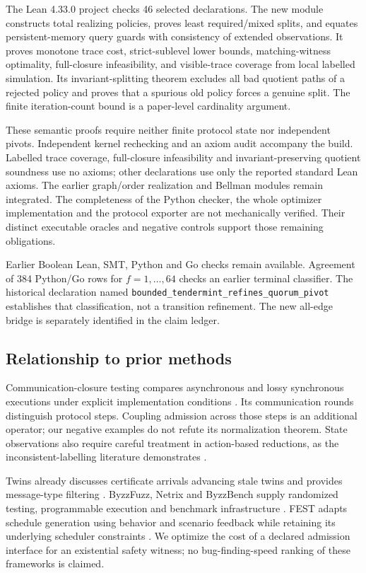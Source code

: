 The Lean 4.33.0 project checks 46 selected declarations. The new module
constructs total realizing policies, proves least required/mixed splits,
and equates persistent-memory query guards with consistency of extended
observations. It proves monotone trace cost, strict-sublevel lower
bounds, matching-witness optimality, full-closure infeasibility, and
visible-trace coverage from local labelled simulation. Its
invariant-splitting theorem excludes all bad quotient paths of a
rejected policy and proves that a spurious old policy forces a genuine
split. The finite iteration-count bound is a paper-level cardinality
argument.

These semantic proofs require neither finite protocol state nor
independent pivots. Independent kernel rechecking and an axiom audit
accompany the build. Labelled trace coverage, full-closure infeasibility
and invariant-preserving quotient soundness use no axioms; other
declarations use only the reported standard Lean axioms. The earlier
graph/order realization and Bellman modules remain integrated. The
completeness of the Python checker, the whole optimizer implementation
and the protocol exporter are not mechanically verified. Their distinct
executable oracles and negative controls support those remaining
obligations.

Earlier Boolean Lean, SMT, Python and Go checks remain available.
Agreement of 384 Python/Go rows for \(f=1,\ldots,64\) checks an earlier
terminal classifier. The historical declaration named
\texttt{bounded\_tendermint\_refines\_quorum\_pivot} establishes that
classification, not a transition refinement. The new all-edge bridge is
separately identified in the claim ledger.

\subsection{Relationship to prior
methods}\label{relationship-to-prior-methods}

Communication-closure testing compares asynchronous and lossy
synchronous executions under explicit implementation conditions
\cite{dragoi2020communication}. Its communication rounds distinguish
protocol steps. Coupling admission across those steps is an additional
operator; our negative examples do not refute its normalization theorem.
State observations also require careful treatment in action-based
reductions, as the inconsistent-labelling literature demonstrates
\cite{neele2021labelling}.

Twins already discusses certificate arrivals advancing stale twins and
provides message-type filtering \cite{bano2021twins}. ByzzFuzz, Netrix
and ByzzBench supply randomized testing, programmable execution and
benchmark infrastructure
\cite{winter2023randomized,dragoi2024netrix,louroneto2025byzzbench}.
FEST adapts schedule generation using behavior and scenario feedback
while retaining its underlying scheduler constraints \cite{li2026fest}.
We optimize the cost of a declared admission interface for an
existential safety witness; no bug-finding-speed ranking of these
frameworks is claimed.

